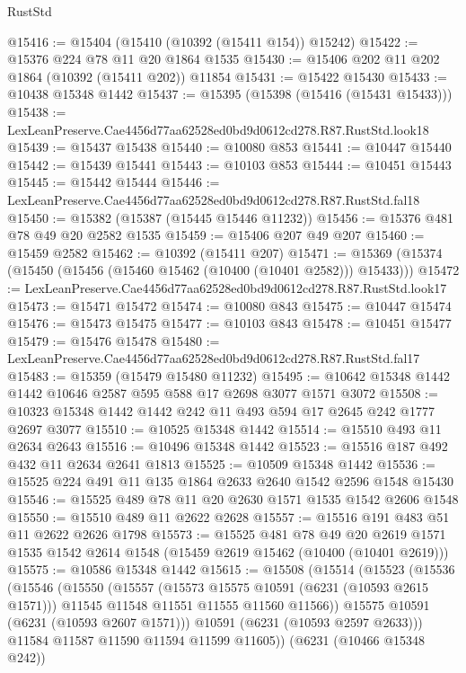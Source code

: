 \begin{lexlean}{RustStd}
\begin{coremodule}
{{@15416 := @15404 (@15410 (@10392 (@15411 @154)) @15242)
@15422 := @15376 @224 @78 @11 @20 @1864 @1535
@15430 := @15406 @202 @11 @202 @1864 (@10392 (@15411 @202)) @11854
@15431 := @15422 @15430
@15433 := @10438 @15348 @1442
@15437 := @15395 (@15398 (@15416 (@15431 @15433)))
@15438 := LexLeanPreserve.Cae4456d77aa62528ed0bd9d0612cd278.R87.RustStd.look18
@15439 := @15437 @15438
@15440 := @10080 @853
@15441 := @10447 @15440
@15442 := @15439 @15441
@15443 := @10103 @853
@15444 := @10451 @15443
@15445 := @15442 @15444
@15446 := LexLeanPreserve.Cae4456d77aa62528ed0bd9d0612cd278.R87.RustStd.fal18
@15450 := @15382 (@15387 (@15445 @15446 @11232))
@15456 := @15376 @481 @78 @49 @20 @2582 @1535
@15459 := @15406 @207 @49 @207
@15460 := @15459 @2582
@15462 := @10392 (@15411 @207)
@15471 := @15369 (@15374 (@15450 (@15456 (@15460 @15462 (@10400 (@10401 @2582))) @15433)))
@15472 := LexLeanPreserve.Cae4456d77aa62528ed0bd9d0612cd278.R87.RustStd.look17
@15473 := @15471 @15472
@15474 := @10080 @843
@15475 := @10447 @15474
@15476 := @15473 @15475
@15477 := @10103 @843
@15478 := @10451 @15477
@15479 := @15476 @15478
@15480 := LexLeanPreserve.Cae4456d77aa62528ed0bd9d0612cd278.R87.RustStd.fal17
@15483 := @15359 (@15479 @15480 @11232)
@15495 := @10642 @15348 @1442 @1442 @10646 @2587 @595 @588 @17 @2698 @3077 @1571 @3072
@15508 := @10323 @15348 @1442 @1442 @242 @11 @493 @594 @17 @2645 @242 @1777 @2697 @3077
@15510 := @10525 @15348 @1442
@15514 := @15510 @493 @11 @2634 @2643
@15516 := @10496 @15348 @1442
@15523 := @15516 @187 @492 @432 @11 @2634 @2641 @1813
@15525 := @10509 @15348 @1442
@15536 := @15525 @224 @491 @11 @135 @1864 @2633 @2640 @1542 @2596 @1548 @15430
@15546 := @15525 @489 @78 @11 @20 @2630 @1571 @1535 @1542 @2606 @1548
@15550 := @15510 @489 @11 @2622 @2628
@15557 := @15516 @191 @483 @51 @11 @2622 @2626 @1798
@15573 := @15525
    @481
    @78
    @49
    @20
    @2619
    @1571
    @1535
    @1542
    @2614
    @1548
    (@15459 @2619 @15462 (@10400 (@10401 @2619)))
@15575 := @10586 @15348 @1442
@15615 := @15508
    (@15514
      (@15523
        (@15536
          (@15546
            (@15550
              (@15557
                (@15573 @15575 @10591 (@6231 (@10593 @2615 @1571)))
                @11545
                @11548
                @11551
                @11555
                @11560
                @11566))
            @15575
            @10591
            (@6231 (@10593 @2607 @1571)))
          @10591
          (@6231 (@10593 @2597 @2633)))
        @11584
        @11587
        @11590
        @11594
        @11599
        @11605))
    (@6231 (@10466 @15348 @242))
}}
\end{coremodule}
\end{lexlean}
